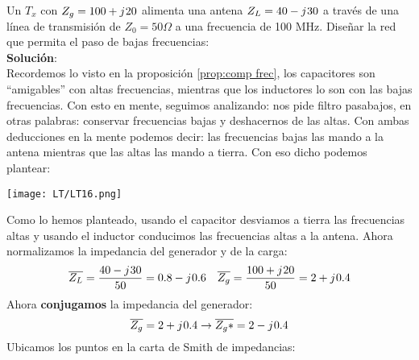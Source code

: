 \documentclass[
	12pt, %
	fleqn, %
	a4paper, %
	oneside, %
]{LegrandOrangeBook}
\begin{document}
\begin{example}
Un $T_x$ con $Z_g=100+{j\mkern1mu} 20$ alimenta una antena $Z_L=40-{j\mkern1mu} 30$ a través de una línea de transmisión de $Z_0=50\Omega$ a una frecuencia de 100 MHz. Diseñar la red que permita el paso de bajas frecuencias:\\
\textbf{Solución}:\\
Recordemos lo visto en la proposición \ref{prop:comp frec}, los capacitores son ``amigables'' con altas frecuencias, mientras que los inductores lo son con las bajas frecuencias. Con esto en mente, seguimos analizando: nos pide filtro pasabajos, en otras 	palabras: conservar frecuencias bajas y deshacernos de las altas. Con ambas deducciones en la mente podemos decir: las frecuencias bajas las mando a la antena mientras que las altas las mando a tierra. Con eso dicho podemos plantear:
\begin{center}
\texttt{[image: LT/LT16.png]}
\end{center}
Como lo hemos planteado, usando el capacitor desviamos a tierra las frecuencias altas y usando el inductor conducimos las frecuencias altas a la antena. Ahora normalizamos la impedancia del generador y de la carga:
\begin{align*}
&\overline{Z_L}=\frac{40-{j\mkern1mu} 30}{50}=0.8-{j\mkern1mu} 0.6 &\overline{Z_g}=\frac{100+{j\mkern1mu} 20}{50}=2+{j\mkern1mu} 0.4
\end{align*}
Ahora \textbf{conjugamos} la impedancia del generador:
\begin{displaymath}
\overline{Z_g}=2+{j\mkern1mu} 0.4\rightarrow \overline{Z_g*}=2-{j\mkern1mu} 0.4
\end{displaymath}
Ubicamos los puntos en la carta de Smith de impedancias:
\begin{center}
\end{center}
\end{example}
\end{document}
